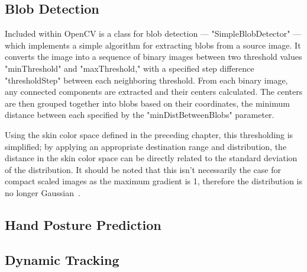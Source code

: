\subsection{Blob Detection}\label{sec:BlobDetection}

Included within OpenCV is a class for blob detection --- "SimpleBlobDetector" --- which implements a simple algorithm for extracting blobs from a source image. It converts the image into a sequence of binary images between two threshold values "minThreshold" and "maxThreshold," with a specified step difference "thresholdStep" between each neighboring threshold. From each binary image, any connected components are extracted and their centers calculated. The centers are then grouped together into blobs based on their coordinates, the minimum distance between each specified by the "minDistBetweenBlobs" parameter.

Using the skin color space defined in the preceding chapter, this thresholding is simplified; by applying an appropriate destination range and distribution, the distance in the skin color space can be directly related to the standard deviation of the distribution. It should be noted that this isn't necessarily the case for compact scaled images as the maximum gradient is 1, therefore the distribution is no longer Gaussian~\cite{Dass2012}.

\subsection{Hand Posture Prediction}\label{sec:HandPosturePrediction}
\subsection{Dynamic Tracking}\label{sec:DynamicTracking}
